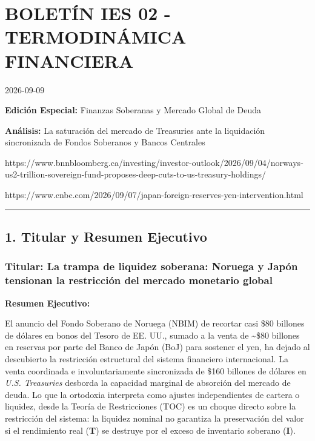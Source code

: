 \documentclass[12pt,letterpaper]{article}
\begin{document}
\hypertarget{boletuxedn-ies-02---termodinuxe1mica-financiera}{%
\section{BOLETÍN IES 02 - TERMODINÁMICA
FINANCIERA}\label{boletuxedn-ies-02---termodinuxe1mica-financiera}}

2026-09-09

\textbf{Edición Especial:} Finanzas Soberanas y Mercado Global de Deuda

\textbf{Análisis:} La saturación del mercado de Treasuries ante la
liquidación sincronizada de Fondos Soberanos y Bancos Centrales

https://www.bnnbloomberg.ca/investing/investor-outlook/2026/09/04/norways-us2-trillion-sovereign-fund-proposes-deep-cuts-to-us-treasury-holdings/

https://www.cnbc.com/2026/09/07/japan-foreign-reserves-yen-intervention.html

\begin{center}\rule{0.5\linewidth}{0.5pt}\end{center}

\hypertarget{titular-y-resumen-ejecutivo}{%
\subsection{1. Titular y Resumen
Ejecutivo}\label{titular-y-resumen-ejecutivo}}

\hypertarget{titular-la-trampa-de-liquidez-soberana-noruega-y-japuxf3n-tensionan-la-restricciuxf3n-del-mercado-monetario-global}{%
\subsubsection{\texorpdfstring{\textbf{Titular:} La trampa de liquidez
soberana: Noruega y Japón tensionan la restricción del mercado monetario
global}{Titular: La trampa de liquidez soberana: Noruega y Japón tensionan la restricción del mercado monetario global}}\label{titular-la-trampa-de-liquidez-soberana-noruega-y-japuxf3n-tensionan-la-restricciuxf3n-del-mercado-monetario-global}}

\textbf{Resumen Ejecutivo:}

El anuncio del Fondo Soberano de Noruega (NBIM) de recortar casi \$80
billones de dólares en bonos del Tesoro de EE. UU., sumado a la venta de
\textasciitilde\$80 billones en reservas por parte del Banco de Japón
(BoJ) para sostener el yen, ha dejado al descubierto la restricción
estructural del sistema financiero internacional. La venta coordinada e
involuntariamente sincronizada de \$160 billones de dólares en
\emph{U.S. Treasuries} desborda la capacidad marginal de absorción del
mercado de deuda. Lo que la ortodoxia interpreta como ajustes
independientes de cartera o liquidez, desde la Teoría de Restricciones
(TOC) es un choque directo sobre la restricción del sistema: la liquidez
nominal no garantiza la preservación del valor si el rendimiento real
(\textbf{T}) se destruye por el exceso de inventario soberano
(\textbf{I}).
\end{document}
